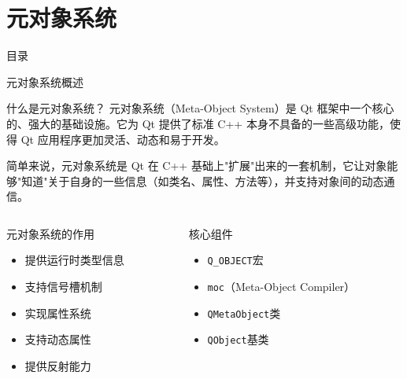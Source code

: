 \documentclass[UTF8,aspectratio=169]{beamer}
\begin{document}
\section{元对象系统}
\begin{frame}{目录}
    \begin{multicols}{2}
        \tableofcontents[currentsection]
    \end{multicols}
\end{frame}

\begin{frame}{元对象系统概述}
    \begin{ytublock}{什么是元对象系统？}
        元对象系统（Meta-Object System）是 Qt 框架中一个核心的、强大的基础设施。它为 Qt 提供了标准 C++ 本身不具备的一些高级功能，使得 Qt 应用程序更加灵活、动态和易于开发。

        简单来说，元对象系统是 Qt 在 C++ 基础上"扩展"出来的一套机制，它让对象能够"知道"关于自身的一些信息（如类名、属性、方法等），并支持对象间的动态通信。
    \end{ytublock}

    \begin{columns}
        \begin{column}{0.48\textwidth}
            \begin{ytublock}{元对象系统的作用}
                \begin{itemize}
                    \item 提供运行时类型信息
                    \item 支持信号槽机制
                    \item 实现属性系统
                    \item 支持动态属性
                    \item 提供反射能力
                \end{itemize}
            \end{ytublock}
        \end{column}
        \begin{column}{0.48\textwidth}
            \begin{ytublock}{核心组件}
                \begin{itemize}
                    \item \texttt{Q\_OBJECT}宏
                    \item \texttt{moc}（Meta-Object Compiler）
                    \item \texttt{QMetaObject}类
                    \item \texttt{QObject}基类
                \end{itemize}
            \end{ytublock}
        \end{column}
    \end{columns}
\end{frame}
\end{document}
